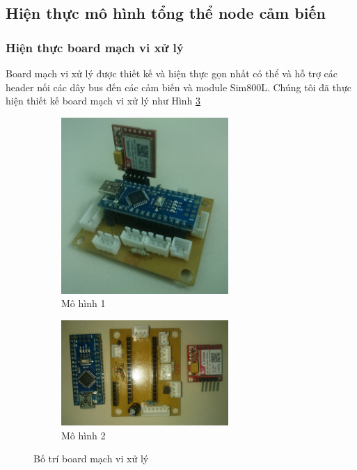 \subsection{Hiện thực mô hình tổng thể node cảm biến}
\subsubsection*{Hiện thực board mạch vi xử lý}
Board mạch vi xử lý được thiết kế và hiện thực gọn nhất có thể và hỗ trợ các header nối các dây bus đến các cảm biến và module Sim800L. Chúng tôi đã thực hiện thiết kế board mạch vi xử lý như Hình \ref{fig:botrimcu}

\begin{figure}[H]
	\centering  
	\begin{subfigure}[b]{0.5\textwidth}
		\includegraphics[width=2.5in]{mcu}
		\caption[Mô hình 1]{Mô hình 1}
		\label{fig:mcu}
	\end{subfigure}\hfill
	\begin{subfigure}[b]{0.5\textwidth}
		\includegraphics[width=2.5in]{mcu_2}
		\caption[Mô hình 2]{Mô hình 2}
		\label{fig:mcu_2}
	\end{subfigure}
	\caption{Bố trí board mạch vi xử lý}\label{fig:botrimcu}
\end{figure}

